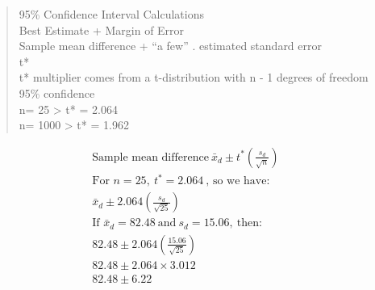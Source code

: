 \documentclass[
  letterpaper,
  DIV=11,
  numbers=noendperiod]{scrartcl}
\begin{document}
\begin{quote}
95\% Confidence Interval Calculations\\
Best Estimate + Margin of Error\\
Sample mean difference + ``a few'' . estimated standard error\\
t*\\
t* multiplier comes from a t-distribution with n - 1 degrees of
freedom\\
95\% confidence\\
n= 25 \textgreater{} t* = 2.064\\
n= 1000 \textgreater{} t* = 1.962
\end{quote}

\begin{align*}
\text{Sample mean difference} \ \bar{x}_d \pm t^* \left( \frac{s_d}{\sqrt{n}} \right) & \\
\text{For } n = 25, \ t^* = 2.064 \ \text{, so we have:} & \\
\bar{x}_d \pm 2.064 \left( \frac{s_d}{\sqrt{25}} \right) & \\
\text{If } \bar{x}_d = 82.48 \ \text{and} \ s_d = 15.06, \ \text{then:} & \\
82.48 \pm 2.064 \left( \frac{15.06}{\sqrt{25}} \right) & \\
82.48 \pm 2.064 \times 3.012 & \\
82.48 \pm 6.22 &
\end{align*}
\end{document}
